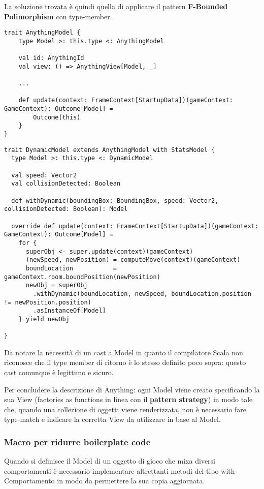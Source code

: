 La soluzione trovata è quindi quella di applicare il pattern \textbf{F-Bounded Polimorphism} con type-member.

\begin{lstlisting}[basicstyle=\tiny]
trait AnythingModel {
    type Model >: this.type <: AnythingModel
    
    val id: AnythingId
    val view: () => AnythingView[Model, _]

    ...

    def update(context: FrameContext[StartupData])(gameContext: GameContext): Outcome[Model] =
        Outcome(this)
    }
}  
\end{lstlisting}

\begin{lstlisting}[basicstyle=\tiny]
trait DynamicModel extends AnythingModel with StatsModel {
  type Model >: this.type <: DynamicModel

  val speed: Vector2
  val collisionDetected: Boolean

  def withDynamic(boundingBox: BoundingBox, speed: Vector2, collisionDetected: Boolean): Model

  override def update(context: FrameContext[StartupData])(gameContext: GameContext): Outcome[Model] =
    for {
      superObj <- super.update(context)(gameContext)
      (newSpeed, newPosition) = computeMove(context)(gameContext)
      boundLocation           = gameContext.room.boundPosition(newPosition)
      newObj = superObj
        .withDynamic(boundLocation, newSpeed, boundLocation.position != newPosition.position)
        .asInstanceOf[Model]
    } yield newObj

} 
\end{lstlisting}

Da notare la necessità di un cast a Model in quanto il compilatore Scala non riconosce che il type member di ritorno è lo stesso definito poco sopra: questo cast comunque è legittimo e sicuro. 

Per concludere la descrizione di Anything: ogni Model viene creato specificando la sua View (factories as functions in linea con il \textbf{pattern strategy}) in modo tale che, quando una collezione di oggetti viene renderizzata, non è necessario fare type-match e indicare la corretta View da utilizzare in base al Model.


\subsubsection{Macro per ridurre boilerplate code}
Quando si definisce il Model di un oggetto di gioco che mixa diversi comportamenti è necessario implementare altrettanti metodi del tipo with-Comportamento in modo da permettere la sua copia aggiornata. 

